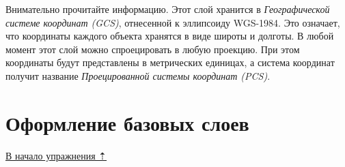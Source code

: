\documentclass[12pt,]{book}
\begin{document}
Внимательно прочитайте информацию. Этот слой хранится в \emph{Географической
системе координат (GCS)}, отнесенной к эллипсоиду WGS-1984. Это
означает, что координаты каждого объекта хранятся в виде широты и
долготы. В любой момент этот слой можно спроецировать в любую проекцию.
При этом координаты будут представлены в метрических единицах, а система
координат получит название \emph{Проецированной системы координат (PCS)}.

\hypertarget{map-design-climates-basic}{%
\section{Оформление базовых слоев}\label{map-design-climates-basic}}

\protect\hyperlink{map-design-climates}{В начало упражнения ⇡}
\end{document}
